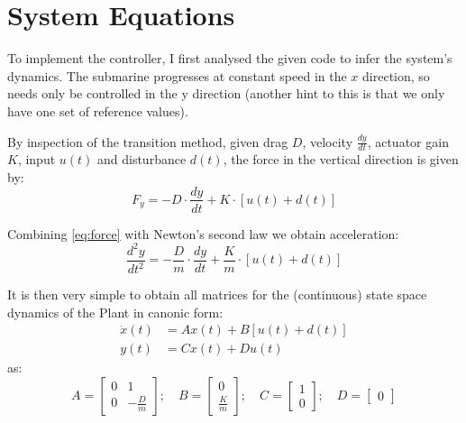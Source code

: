 \documentclass[hidelinks]{article}
\begin{document}
\section{System Equations} \label{appendix}
To implement the controller, I first analysed the given code to infer the system's dynamics. The submarine progresses at constant speed in the $x$ direction, so needs only be controlled in the y direction (another hint to this is that we only have one set of reference values).
\par By inspection of the transition method, given drag $D$, velocity $\frac{dy}{dt}$, actuator gain $K$, input $u(t)$ and disturbance $d(t)$, the force in the vertical direction is given by:
%
\begin{equation}
    F_y = - D \cdot \frac{dy}{dt} + K \cdot [u(t) + d(t)] \label{eq:force}
\end{equation}
%
\par Combining \eqref{eq:force} with Newton's second law we obtain acceleration:
%
\begin{equation}
    \frac{d^2y}{dt^2} = -\frac{D}{m} \cdot \frac{dy}{dt} + \frac{K}{m} \cdot [u(t) + d(t)] \label{eq:accelleration}
\end{equation}
%
\par It is then very simple to obtain all matrices for the (continuous) state space dynamics of the Plant in canonic form:
\begin{equation}
    \begin{aligned}
        \dot{x}(t) &= A x(t) + B [u(t) + d(t)] \\
        y(t) &= C x(t) + D u(t) \label{eq:plant}
    \end{aligned}
\end{equation}
%
as:
%
\begin{equation}
    \displaystyle
    A = \begin{bmatrix}
            0 & 1 \\
            0 & -\frac{D}{m}
        \end{bmatrix}; \quad
    B = \begin{bmatrix}
            0 \\
            \frac{K}{m}
        \end{bmatrix}; \quad
    C = \begin{bmatrix}
            1 \\
            0
          \end{bmatrix}; \quad
    D = \begin{bmatrix}
            0
        \end{bmatrix} \label{eq:matrices}
\end{equation}
\end{document}
